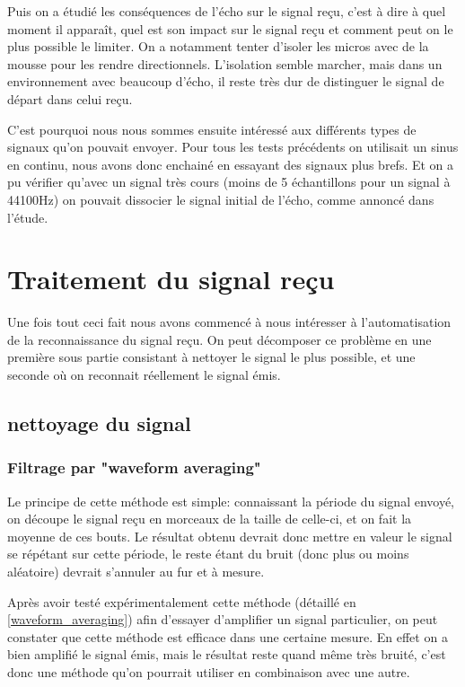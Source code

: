 \documentclass[12pt,a4paper]{report}
\begin{document}
Puis on a étudié les conséquences de l'écho sur le signal reçu, c'est à dire à quel moment il apparaît, quel est son impact sur le signal reçu et comment peut on le plus possible le limiter. On a notamment tenter d'isoler les micros avec de la mousse pour les rendre directionnels. L'isolation semble marcher, mais dans un environnement avec beaucoup d'écho, il reste très dur de distinguer le signal de départ dans celui reçu.

C'est pourquoi nous nous sommes ensuite intéressé aux différents types de signaux qu'on pouvait envoyer. Pour tous les tests précédents on utilisait un sinus en continu, nous avons donc enchainé en essayant des signaux plus brefs. Et on a pu vérifier qu'avec un signal très cours (moins de 5 échantillons pour un signal à 44100Hz) on pouvait dissocier le signal initial de l'écho, comme annoncé dans l'étude. 

\section{Traitement du signal reçu}

Une fois tout ceci fait nous avons commencé à nous intéresser à l'automatisation de la reconnaissance du signal reçu. On peut décomposer ce problème en une première sous partie consistant à nettoyer le signal le plus possible, et une seconde où on reconnait réellement le signal émis.
\subsection{nettoyage du signal}
\subsubsection{Filtrage par "waveform averaging"}
Le principe de cette méthode est simple: connaissant la période du signal envoyé, on découpe le signal reçu en morceaux de la taille de celle-ci, et on fait la moyenne de ces bouts. Le résultat obtenu devrait donc mettre en valeur le signal se répétant sur cette période, le reste étant du bruit (donc plus ou moins aléatoire) devrait s'annuler au fur et à mesure.

Après avoir testé expérimentalement cette méthode (détaillé en \ref{waveform_averaging}) afin d'essayer d'amplifier un signal particulier, on peut constater que cette méthode est efficace dans une certaine mesure. En effet on a bien amplifié le signal émis, mais le résultat reste quand même très bruité, c'est donc une méthode qu'on pourrait utiliser en combinaison avec une autre.
\end{document}
